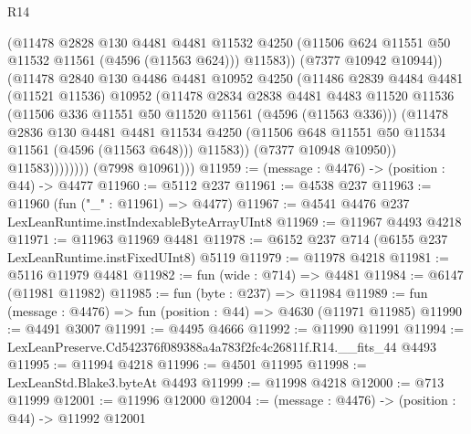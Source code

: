 \begin{lexlean}{R14}
\begin{coremodule}
                          (@11478
                            @2828
                            @130
                            @4481
                            @4481
                            @11532
                            @4250
                            (@11506 @624 @11551 @50 @11532 @11561 (@4596 (@11563 @624)))
                            @11583))
                        (@7377 @10942 @10944))
                      (@11478
                        @2840
                        @130
                        @4486
                        @4481
                        @10952
                        @4250
                        (@11486
                          @2839
                          @4484
                          @4481
                          (@11521 @11536)
                          @10952
                          (@11478
                            @2834
                            @2838
                            @4481
                            @4483
                            @11520
                            @11536
                            (@11506 @336 @11551 @50 @11520 @11561 (@4596 (@11563 @336)))
                            (@11478
                              @2836
                              @130
                              @4481
                              @4481
                              @11534
                              @4250
                              (@11506 @648 @11551 @50 @11534 @11561 (@4596 (@11563 @648)))
                              @11583))
                          (@7377 @10948 @10950))
                        @11583))))))))
        (@7998 @10961)))
@11959 := (message : @4476) -> (position : @44) -> @4477
@11960 := @5112 @237
@11961 := @4538 @237
@11963 := @11960 (fun ("_" : @11961) => @4477)
@11967 := @4541 @4476 @237 LexLeanRuntime.instIndexableByteArrayUInt8
@11969 := @11967 @4493 @4218
@11971 := @11963 @11969 @4481
@11978 := @6152 @237 @714 (@6155 @237 LexLeanRuntime.instFixedUInt8) @5119
@11979 := @11978 @4218
@11981 := @5116 @11979 @4481
@11982 := fun (wide : @714) => @4481
@11984 := @6147 (@11981 @11982)
@11985 := fun (byte : @237) => @11984
@11989 := fun (message : @4476) => fun (position : @44) => @4630 (@11971 @11985)
@11990 := @4491 @3007
@11991 := @4495 @4666
@11992 := @11990 @11991
@11994 := LexLeanPreserve.Cd542376f089388a4a783f2fc4c26811f.R14.__fits_44 @4493
@11995 := @11994 @4218
@11996 := @4501 @11995
@11998 := LexLeanStd.Blake3.byteAt @4493
@11999 := @11998 @4218
@12000 := @713 @11999
@12001 := @11996 @12000
@12004 := (message : @4476) -> (position : @44) -> @11992 @12001

\end{coremodule}
\end{lexlean}
